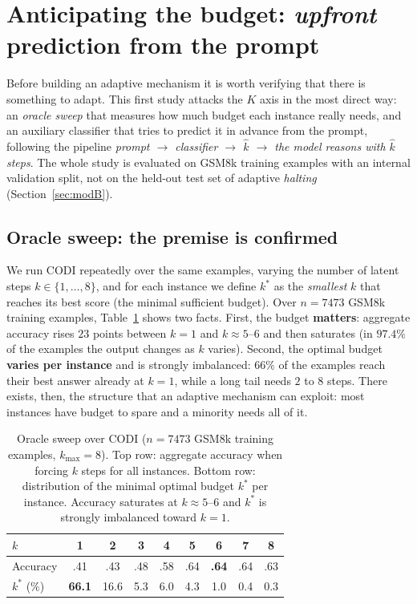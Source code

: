 \documentclass[11pt]{article}
\begin{document}
\section{Anticipating the budget: \textit{upfront} prediction from the prompt}
\label{sec:modA}

Before building an adaptive mechanism it is worth verifying that there is something to adapt. This first study attacks the $K$ axis in the most direct way: an \emph{oracle sweep} that measures how much budget each instance really needs, and an auxiliary classifier that tries to predict it in advance from the prompt, following the pipeline \emph{prompt $\rightarrow$ classifier $\rightarrow$ $\hat{k}$ $\rightarrow$ the model reasons with $\hat{k}$ steps}. The whole study is evaluated on GSM8k training examples with an internal validation split, not on the held-out test set of adaptive \textit{halting} (Section~\ref{sec:modB}).

\subsection{Oracle sweep: the premise is confirmed}
\label{sec:ksweep}

We run CODI repeatedly over the same examples, varying the number of latent steps $k \in \{1,\dots,8\}$, and for each instance we define $k^*$ as the \emph{smallest} $k$ that reaches its best score (the minimal sufficient budget). Over $n{=}7473$ GSM8k training examples, Table~\ref{tab:ksweep} shows two facts. First, the budget \textbf{matters}: aggregate accuracy rises $23$ points between $k{=}1$ and $k{\approx}5$--$6$ and then saturates (in $97.4\%$ of the examples the output changes as $k$ varies). Second, the optimal budget \textbf{varies per instance} and is strongly imbalanced: $66\%$ of the examples reach their best answer already at $k{=}1$, while a long tail needs $2$ to $8$ steps. There exists, then, the structure that an adaptive mechanism can exploit: most instances have budget to spare and a minority needs all of it.

\begin{table}[t]
  \centering
  \small
  \setlength{\tabcolsep}{4.2pt}
  \begin{tabular}{lcccccccc}
    \toprule
    $k$ & 1 & 2 & 3 & 4 & 5 & 6 & 7 & 8 \\
    \midrule
    Accuracy & .41 & .43 & .48 & .58 & .64 & \textbf{.64} & .64 & .63 \\
    $k^*$ (\%) & \textbf{66.1} & 16.6 & 5.3 & 6.0 & 4.3 & 1.0 & 0.4 & 0.3 \\
    \bottomrule
  \end{tabular}
  \caption{Oracle sweep over CODI ($n{=}7473$ GSM8k training examples, $k_{\max}{=}8$). Top row: aggregate accuracy when forcing $k$ steps for all instances. Bottom row: distribution of the minimal optimal budget $k^*$ per instance. Accuracy saturates at $k{\approx}5$--$6$ and $k^*$ is strongly imbalanced toward $k{=}1$.}
  \label{tab:ksweep}
\end{table}
\end{document}

